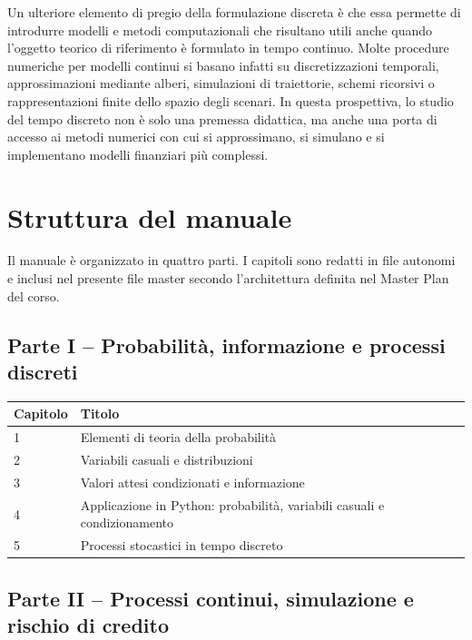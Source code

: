 \documentclass[oneside,openany]{memoir}%
\newcommand{\1}{\mathbf{1}}
\begin{document}
Un ulteriore elemento di pregio della formulazione discreta \`{e} che essa
permette di introdurre modelli e metodi computazionali che risultano utili
anche quando l'oggetto teorico di riferimento \`{e} formulato in tempo
continuo. Molte procedure numeriche per modelli continui si basano infatti su
discretizzazioni temporali, approssimazioni mediante alberi, simulazioni di
traiettorie, schemi ricorsivi o rappresentazioni finite dello spazio degli
scenari. In questa prospettiva, lo studio del tempo discreto non \`{e} solo
una premessa didattica, ma anche una porta di accesso ai metodi numerici con
cui si approssimano, si simulano e si implementano modelli finanziari pi\`{u} complessi.

\chapter*{Struttura del manuale}


Il manuale \`{e} organizzato in quattro parti. I capitoli sono redatti
in file autonomi e inclusi nel presente file master secondo
l'architettura definita nel Master Plan del corso.

\section*{Parte I -- Probabilit\`{a}, informazione e processi discreti}

\begin{center}%
\begin{tabular}
[c]{ll}\hline
Capitolo & Titolo\\\hline
1 & Elementi di teoria della probabilit\`{a}\\
2 & Variabili casuali e distribuzioni\\
3 & Valori attesi condizionati e informazione\\
4 & Applicazione in Python: probabilit\`{a}, variabili casuali e
condizionamento\\
5 & Processi stocastici in tempo discreto\\\hline
\end{tabular}



\end{center}

\section*{Parte II -- Processi continui, simulazione e rischio di credito}
\end{document}
